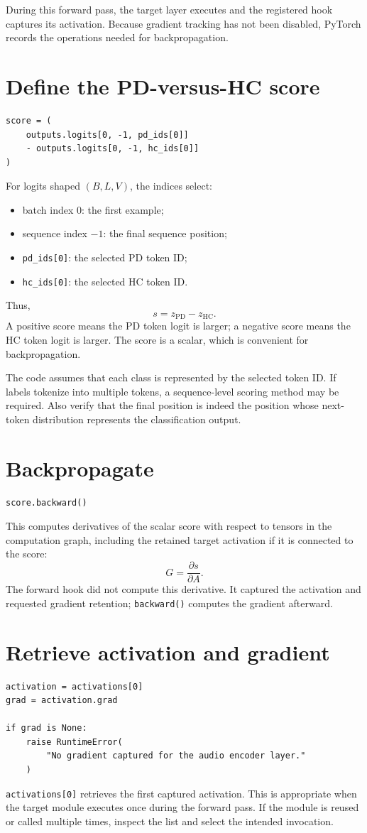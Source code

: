 \documentclass[11pt,a4paper]{article}
\begin{document}
During this forward pass, the target layer executes and the registered hook captures its activation. Because gradient tracking has not been disabled, PyTorch records the operations needed for backpropagation.

\section{Define the PD-versus-HC score}
\begin{lstlisting}[style=python]
score = (
    outputs.logits[0, -1, pd_ids[0]]
    - outputs.logits[0, -1, hc_ids[0]]
)
\end{lstlisting}
For logits shaped $(B,L,V)$, the indices select:
\begin{itemize}
\item batch index $0$: the first example;
\item sequence index $-1$: the final sequence position;
\item \texttt{pd\_ids[0]}: the selected PD token ID;
\item \texttt{hc\_ids[0]}: the selected HC token ID.
\end{itemize}
Thus,
\[
s=z_{\mathrm{PD}}-z_{\mathrm{HC}}.
\]
A positive score means the PD token logit is larger; a negative score means the HC token logit is larger. The score is a scalar, which is convenient for backpropagation.

The code assumes that each class is represented by the selected token ID. If labels tokenize into multiple tokens, a sequence-level scoring method may be required. Also verify that the final position is indeed the position whose next-token distribution represents the classification output.

\section{Backpropagate}
\begin{lstlisting}[style=python]
score.backward()
\end{lstlisting}
This computes derivatives of the scalar score with respect to tensors in the computation graph, including the retained target activation if it is connected to the score:
\[
G=\frac{\partial s}{\partial A}.
\]
The forward hook did not compute this derivative. It captured the activation and requested gradient retention; \texttt{backward()} computes the gradient afterward.

\section{Retrieve activation and gradient}
\begin{lstlisting}[style=python]
activation = activations[0]
grad = activation.grad

if grad is None:
    raise RuntimeError(
        "No gradient captured for the audio encoder layer."
    )
\end{lstlisting}
\texttt{activations[0]} retrieves the first captured activation. This is appropriate when the target module executes once during the forward pass. If the module is reused or called multiple times, inspect the list and select the intended invocation.
\end{document}
